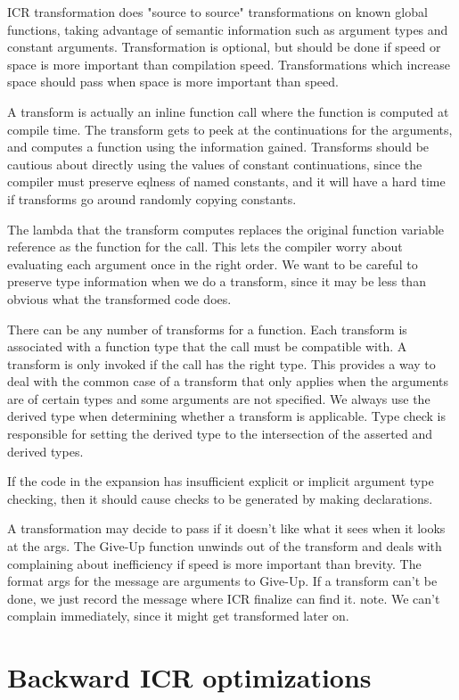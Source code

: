 ICR transformation does "source to source" transformations on known global
functions, taking advantage of semantic information such as argument types and
constant arguments.  Transformation is optional, but should be done if speed or
space is more important than compilation speed.  Transformations which increase
space should pass when space is more important than speed.

A transform is actually an inline function call where the function is computed
at compile time.  The transform gets to peek at the continuations for the
arguments, and computes a function using the information gained.  Transforms
should be cautious about directly using the values of constant continuations,
since the compiler must preserve eqlness of named constants, and it will have a
hard time if transforms go around randomly copying constants.

The lambda that the transform computes replaces the original function variable
reference as the function for the call.  This lets the compiler worry about
evaluating each argument once in the right order.  We want to be careful to
preserve type information when we do a transform, since it may be less than
obvious what the transformed code does.

There can be any number of transforms for a function.  Each transform is
associated with a function type that the call must be compatible with.  A
transform is only invoked if the call has the right type.  This provides a way
to deal with the common case of a transform that only applies when the
arguments are of certain types and some arguments are not specified.  We always
use the derived type when determining whether a transform is applicable.  Type
check is responsible for setting the derived type to the intersection of the
asserted and derived types.

If the code in the expansion has insufficient explicit or implicit argument
type checking, then it should cause checks to be generated by making
declarations.

A transformation may decide to pass if it doesn't like what it sees when it
looks at the args.  The Give-Up function unwinds out of the transform and deals
with complaining about inefficiency if speed is more important than brevity.
The format args for the message are arguments to Give-Up.  If a transform can't
be done, we just record the message where ICR finalize can find it.  note.  We
can't complain immediately, since it might get transformed later on.


\section{Backward ICR optimizations}

